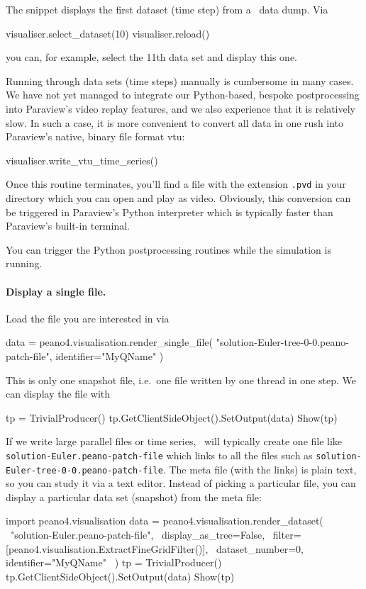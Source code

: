 \noindent
The snippet displays the first dataset (time step) from a \Peano\ data dump.
Via 
\begin{code}
visualiser.select_dataset(10)
visualiser.reload()
\end{code}
you can, for example, select the 11th data set and display this one.


Running through data sets (time steps) manually is cumbersome in many cases.
We have not yet managed to integrate our Python-based, bespoke postprocessing
into Paraview's video replay features, and we also experience that it is relatively 
slow.
In such a case, it is more convenient to convert all data in one rush 
into Paraview's native, binary file format vtu:
\begin{code}
visualiser.write_vtu_time_series()
\end{code}


\noindent
Once this routine terminates, you'll find a file with the extension \texttt{.pvd}
in your directory which you can open and play as video.
Obviously, this conversion can be triggered in Paraview's Python interpreter 
which is typically faster than Paraview's built-in terminal.

\begin{remark}
 You can trigger the Python postprocessing routines while the simulation is running.
\end{remark}



\paragraph{Display a single file.}
%
%
Load the file you are interested in via
\begin{code}
data = peano4.visualisation.render_single_file(  "solution-Euler-tree-0-0.peano-patch-file", identifier="MyQName" )
\end{code}

\noindent
This is only one snapshot file, i.e.~one file written by one thread in one step. 
We can display the file with
\begin{code}
tp = TrivialProducer()
tp.GetClientSideObject().SetOutput(data)
Show(tp)
\end{code}


\noindent
If we write large parallel files or time series, \Peano\ will typically 
create one file like \texttt{solution-Euler.peano-patch-file} which links
to all the files such as \linebreak \texttt{solution-Euler-tree-0-0.peano-patch-file}.
The meta file (with the links) is plain text, so you can study it via a 
text editor.
Instead of picking a particular file, 
you can display a particular data set (snapshot) from the meta file:
\begin{code}
import peano4.visualisation  
data = peano4.visualisation.render_dataset( \
  "solution-Euler.peano-patch-file", \
  display_as_tree=False, \
  filter=[peano4.visualisation.ExtractFineGridFilter()], \
  dataset_number=0, identifier="MyQName" \
)
tp = TrivialProducer()
tp.GetClientSideObject().SetOutput(data)
Show(tp)
\end{code}



